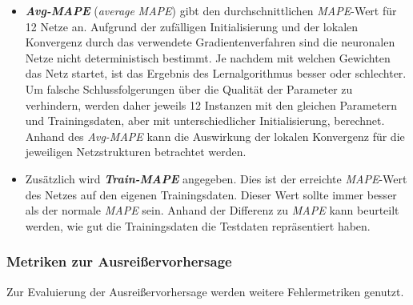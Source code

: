 \documentclass[
	12pt,
	a4paper,
	BCOR10mm,
	DIV14,
	listof=totoc,
	bibliography=totoc,
	headsepline
]{scrreprt}
\begin{document}
\begin{itemize}
	\item \textit{\textbf{Avg-MAPE}} (\textit{average} \textit{MAPE}) gibt den durchschnittlichen \textit{MAPE}-Wert für 12 Netze an. 
	Aufgrund der zufälligen Initialisierung und der lokalen Konvergenz durch das verwendete Gradientenverfahren sind die neuronalen Netze nicht deterministisch bestimmt.
	Je nachdem mit welchen Gewichten das Netz startet, ist das Ergebnis des Lernalgorithmus besser oder schlechter. Um falsche Schlussfolgerungen über die Qualität der Parameter zu verhindern, werden daher jeweils 12 Instanzen mit den gleichen Parametern und Trainingsdaten, aber mit unterschiedlicher Initialisierung, berechnet.
	Anhand des \textit{Avg-MAPE} kann die Auswirkung der lokalen Konvergenz für die jeweiligen Netzstrukturen betrachtet werden.
	\item Zusätzlich wird \textit{\textbf{Train-MAPE}} angegeben. Dies ist der erreichte \textit{MAPE}-Wert des Netzes auf den eigenen Trainingsdaten. Dieser Wert sollte immer besser als der normale \textit{MAPE} sein. Anhand der Differenz zu \textit{MAPE} kann beurteilt werden, wie gut die Trainingsdaten die Testdaten repräsentiert haben.
\end{itemize}

\subsubsection{Metriken zur Ausreißervorhersage}
Zur Evaluierung der Ausreißervorhersage werden weitere Fehlermetriken genutzt.\medskip
\end{document}
